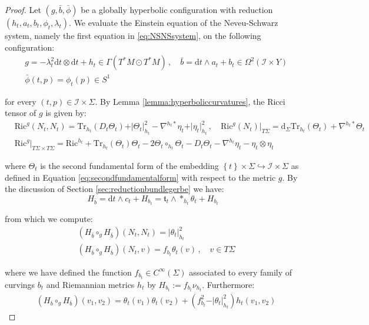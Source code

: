 \documentclass[10pt,reqno,a4paper]{amsart}
\theoremstyle{plain}
\theoremstyle{definition}
\theoremstyle{remark}
\theoremstyle{remark}
\def\dd{\mathrm{d}}
\newcommand{\Tr}{\mathrm{Tr}}
\def\cI{\mathcal{I}}
\newcommand{\Ric}{\mathrm{Ric}}
\renewcommand{\(}{ (}
\renewcommand{\)}{ )}
\begin{document}
\begin{proof}
Let $(g,\bar{b},\bar{\phi})$ be a globally hyperbolic configuration with reduction $( h_t , a_t , b_t , \phi_t,\lambda_t)$. We evaluate the Einstein equation of the Neveu-Schwarz system, namely the first equation in \eqref{eq:NSNSsystem}, on the following configuration:
\begin{eqnarray*}
& g = - \lambda_t^2\dd t\otimes \dd t + h_t \in \Gamma(T^{\ast}M\odot T^{\ast}M) \, , \quad \bar{b} = \dd t\wedge a_t + b_t \in \Omega^2(\cI\times Y)\\
& \bar{\phi}(t,p) = \phi_t(p)\in S^1
\end{eqnarray*}

\noindent
for every $(t,p)\in \cI\times \Sigma$. By Lemma \ref{lemma:hyperboliccurvatures}, the Ricci tensor of $g$ is given by:
\begin{eqnarray*}
& \Ric^{g} (N_t , N_t) =  \Tr_{h_t}(D_t\Theta_t) + \vert \Theta_t\vert^2_{h_t}-\nabla^{h_t\ast}\eta_t+\vert\eta_t\vert_{h_t}^2 \,  ,\quad \Ric^g(N_t)\vert_{T\Sigma} = \dd_{\Sigma} \Tr_{h_t}(\Theta_t) + \nabla^{h_t\ast}\Theta_t\\
& \Ric^{g}\vert_{T\Sigma\times T\Sigma} = \Ric^{h_t} + \Tr_{h_t}(\Theta_t) \Theta_t - 2 \Theta_t\circ_{h_t} \Theta_t - D_t \Theta_t-\nabla^{h_t}\eta_t-\eta_t\otimes\eta_t 
\end{eqnarray*}

\noindent
where $\Theta_t$ is the second fundamental form of the embedding $\left\{ t\right\}\times \Sigma \hookrightarrow \cI \times \Sigma$ as defined in Equation \eqref{eq:secondfundamentalform} with respect to the metric $g$. By the discussion of Section \ref{sec:reductionbundlegerbe} we have:
\begin{equation*}
H_{\bar{b}} = \dd t \wedge c_t + H_{b_t} = \mathfrak{t}_t \wedge \ast_{h_t} \theta_t + H_{b_t}
\end{equation*}

\noindent
from which we compute:
\begin{eqnarray*}
& (H_{\bar{b}}\circ_{g} H_{\bar{b}}) (N_t , N_t) = \vert \theta_t \vert_{h_t}^2\\
& (H_{\bar{b}}\circ_{g} H_{\bar{b}}) (N_t , v) = f_{b_t} \theta_t(v)\, , \quad v\in T\Sigma
\end{eqnarray*}

\noindent
where we have defined the function $f_{b_t} \in C^{\infty}(\Sigma)$ associated to every family of curvings $b_t$ and Riemannian metrics $h_t$ by $H_{b_t} := f_{b_t} \nu_{h_t}$. Furthermore:
\begin{eqnarray*}
& (H_{\bar{b}}\circ_{g} H_{\bar{b}})(v_1,v_2) = \theta_t(v_1)\theta_t(v_2)+(f_{b_t}^2-\vert\theta_t\vert_{h_t}^2)h_t(v_1,v_2)
\end{eqnarray*}


\end{proof}
\end{document}

